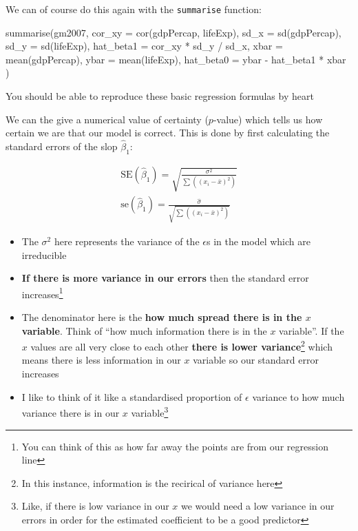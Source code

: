 \documentclass[
]{report}
\newenvironment{Shaded}{\begin{snugshade}}{\end{snugshade}}
\newcommand{\AttributeTok}[1]{\textcolor[rgb]{0.80,0.80,0.80}{#1}}
\newcommand{\FunctionTok}[1]{\textcolor[rgb]{0.94,0.94,0.56}{#1}}
\newcommand{\NormalTok}[1]{\textcolor[rgb]{0.80,0.80,0.80}{#1}}
\newcommand{\SpecialCharTok}[1]{\textcolor[rgb]{0.86,0.64,0.64}{#1}}
\providecommand{\tightlist}{%
  \setlength{\itemsep}{0pt}\setlength{\parskip}{0pt}}
\renewenvironment{quote}{
	\bigskip\begin{mdframed}[
			skipabove=\topskip,
			skipbelow=\topskip,
			backgroundcolor=quoteshadecolor,
			leftmargin=0.5cm,
			rightmargin=0.5cm,
			topline=false,
			rightline=false,
			bottomline=false,
			nobreak=true,
		]\itshape%
		}{
	\end{mdframed}
}
\renewenvironment{Shaded}{
	\bigskip
	\begin{tcolorbox}[drop fuzzy midday shadow]
		\begin{mdframed}[
				skipabove=\topskip*2,
				outerlinewidth= 0,
				linewidth=0pt,
				roundcorner= 3pt,
				backgroundcolor= shadecolor,
				outerlinecolor= shadecolor,
				innertopmargin= \topskip,
				innerbottommargin=\topskip,
				leftmargin=-0.8cm,
				rightmargin=-0.8cm
			]}{
		\end{mdframed}
	\end{tcolorbox}
	\smallskip
}
\theoremstyle{definition}
\theoremstyle{definition}
\theoremstyle{definition}
\theoremstyle{definition}
\theoremstyle{remark}
\begin{document}
We can of course do this again with the \texttt{summarise} function:

\begin{Shaded}
\begin{Highlighting}[numbers=left,,]
\FunctionTok{summarise}\NormalTok{(gm2007,}
  \AttributeTok{cor\_xy =} \FunctionTok{cor}\NormalTok{(gdpPercap, lifeExp),}
  \AttributeTok{sd\_x =} \FunctionTok{sd}\NormalTok{(gdpPercap),}
  \AttributeTok{sd\_y =} \FunctionTok{sd}\NormalTok{(lifeExp),}
  \AttributeTok{hat\_beta1 =}\NormalTok{ cor\_xy }\SpecialCharTok{*}\NormalTok{ sd\_y }\SpecialCharTok{/}\NormalTok{ sd\_x,}
  \AttributeTok{xbar =} \FunctionTok{mean}\NormalTok{(gdpPercap),}
  \AttributeTok{ybar =} \FunctionTok{mean}\NormalTok{(lifeExp),}
  \AttributeTok{hat\_beta0 =}\NormalTok{ ybar }\SpecialCharTok{{-}}\NormalTok{ hat\_beta1 }\SpecialCharTok{*}\NormalTok{ xbar}
\NormalTok{)}
\end{Highlighting}
\end{Shaded}

\begin{quote}
You should be able to reproduce these basic regression formulas by heart
\end{quote}

We can the give a numerical value of certainty (\(p\)-value) which tells us how
certain we are that our model is correct. This is done by first calculating the
standard errors of the slop \(\hat{\beta}_{1}\):

\begin{equation}
  \begin{aligned}
    \text{SE}(\hat \beta_1) = \sqrt{\frac{\sigma^2}{\sum_{}((x_i - \bar x)^2)}}\\
    \text{se}(\hat \beta_1) = \frac{\hat \sigma}{\sqrt{\sum_{}((x_i - \bar
    x)^2)}}
    \label{eq:se-beta1}
  \end{aligned}
\end{equation}

\begin{itemize}
\tightlist
\item
  The \(\sigma^{2}\) here represents the variance of the \(\epsilon\)s in the model
  which are irreducible
\item
  \textbf{If there is more variance in our errors} then the standard error
  increases\footnote{You can think of this as how far
    away the points are from our regression line}
\item
  The denominator here is the \textbf{how much spread there is in the \(x\) variable}.
  Think of ``how much information there is in the \(x\) variable''. If the \(x\)
  values are all very close to each other \textbf{there is lower variance}\footnote{In this
    instance, information is the recirical of variance here} which means there is
  less information in our \(x\) variable so our standard error increases
\item
  I like to think of it like a standardised proportion of \(\epsilon\) variance
  to how much variance there is in our \(x\) variable\footnote{Like, if there is low
    variance in our \(x\) we would need a low variance in our errors in order for
    the estimated coefficient to be a good predictor}
\end{itemize}
\end{document}
